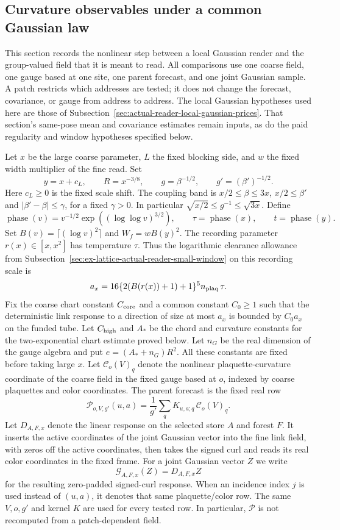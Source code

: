 \subsection{Curvature observables under a common Gaussian law}
\label{sec:actual-reader-guarded-curvature}

This section records the nonlinear step between a local Gaussian reader and
the group-valued field that it is meant to read. All comparisons use one
coarse field, one gauge based at one site, one parent forecast, and one joint
Gaussian sample. A patch restricts which addresses are tested; it does not
change the forecast, covariance, or gauge from address to address. The
local Gaussian hypotheses used here are those of
Subsection~\ref{sec:actual-reader-local-gaussian-prices}. That section's
same-pose mean and covariance estimates remain inputs, as do the paid
regularity and window hypotheses specified below.

Let $x$ be the large coarse parameter, $L$ the fixed blocking side, and $w$
the fixed width multiplier of the fine read. Set
\[
 y=x+c_L,\qquad R=x^{-3/8},\qquad
 g=\beta^{-1/2},\qquad g'=(\beta')^{-1/2}.
\]
Here $c_L\ge0$ is the fixed scale shift. The coupling band is
$x/2\le\beta\le3x$, $x/2\le\beta'$ and $|\beta'-\beta|\le\gamma$,
for a fixed $\gamma>0$.
In particular $\sqrt{x/2}\le g^{-1}\le\sqrt{3x}$. Define
\[
 \operatorname{phase}(v)=v^{-1/2}\exp((\log\log v)^{3/2}),
 \qquad \tau=\operatorname{phase}(x),\qquad t=\operatorname{phase}(y).
\]
Set $B(v)=\lceil(\log v)^2\rceil$ and $W_f=w B(y)^2$. The recording parameter
$r(x)\in[x,x^2]$ has temperature $\tau$. Thus the logarithmic clearance
allowance from Subsection~\ref{sec:ex-lattice-actual-reader-small-window}
on this recording scale is
\[
 a_x=16\{2(B(r(x))+1)+1\}^5 n_{\rm plaq}\,\tau .
\]
Fix the coarse chart constant $C_{\rm core}$ and a common constant
$C_0\ge1$ such that the deterministic link response to a direction of
size at most $a_x$ is bounded by $C_0a_x$ on the funded tube. Let
$C_{\rm high}$ and $A_*$ be the chord and curvature constants for the
two-exponential chart estimate proved below. Let $n_G$ be the real
dimension of the gauge algebra and put $e=(A_*+n_G)R^2$. All these
constants are fixed before taking large $x$.
Let $\mathcal C_o(V)_q$ denote the nonlinear plaquette-curvature coordinate
of the coarse field in the fixed gauge based at $o$, indexed by coarse
plaquettes and color coordinates. The parent forecast is the fixed real row
\[
 \mathcal P_{o,V,g'}(u,a)=\frac1{g'}
   \sum_q K_{u,a;q}\,\mathcal C_o(V)_q.
\]
Let $D_{A,F,x}$ denote the linear response on the selected store $A$
and forest $F$. It inserts the active coordinates of the joint Gaussian
vector into the fine link field, with zeros off the active coordinates,
then takes the signed curl and reads its real color coordinates in the
fixed frame. For a joint Gaussian vector $Z$ we write
\[
 \mathcal G_{A,F,x}(Z)=D_{A,F,x}Z
\]
for the resulting zero-padded signed-curl response.
When an incidence index $j$ is used instead of $(u,a)$, it denotes that
same plaquette/color row. The same $V,o,g'$ and kernel $K$ are used for every tested row. In
particular, $\mathcal P$ is not recomputed from a patch-dependent field.

